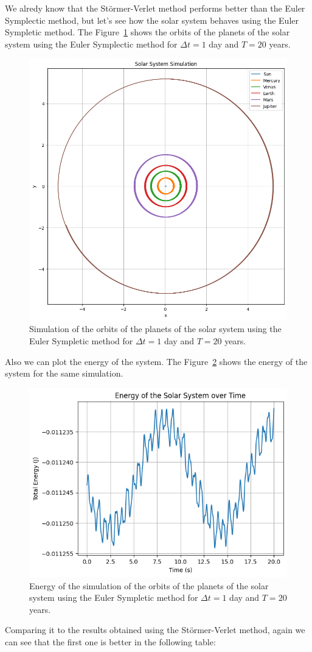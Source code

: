 \documentclass{article}
\begin{document}
We alredy know that the Störmer-Verlet method performs better than the Euler Symplectic method, but let's see how the solar system behaves using the Euler Sympletic method. The Figure~\ref{fig:solarsystemeuler} shows the orbits of the planets of the solar system using the Euler Symplectic method for \(\Delta t = 1\) day and \(T = 20\) years.

\begin{figure}[H]
	\centering
	\includegraphics[width=0.5\linewidth]{./Figures/SolarSystem/orbits_euler.png}
	\caption{Simulation of the orbits of the planets of the solar system using the Euler Sympletic method for \(\Delta t = 1\) day and \(T = 20\) years.}
	\label{fig:solarsystemeuler}
\end{figure}

Also we can plot the energy of the system. The Figure~\ref{fig:solarsystemenergyeuler} shows the energy of the system for the same simulation.

\begin{figure}[H]
	\centering
	\includegraphics[width=0.5\linewidth]{./Figures/SolarSystem/energy_euler.png}
	\caption{Energy of the simulation of the orbits of the planets of the solar system using the Euler Sympletic method for \(\Delta t = 1\) day and \(T = 20\) years.}
	\label{fig:solarsystemenergyeuler}
\end{figure}

Comparing it to the results obtained using the Störmer-Verlet method, again we can see that the first one is better in the following table:
\end{document}
